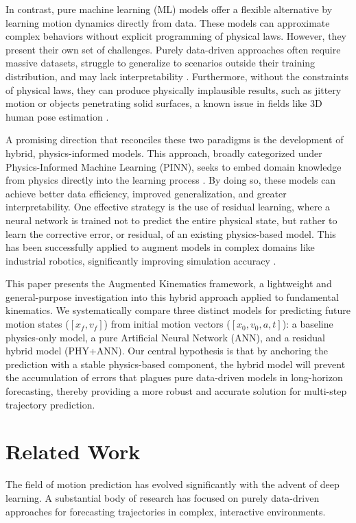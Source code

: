 \documentclass[conference]{IEEEtran}
\begin{document}
In contrast, pure machine learning (ML) models offer a flexible alternative by learning motion dynamics directly from data. These models can approximate complex behaviors without explicit programming of physical laws. However, they present their own set of challenges. Purely data-driven approaches often require massive datasets, struggle to generalize to scenarios outside their training distribution, and may lack interpretability \cite{b5}. Furthermore, without the constraints of physical laws, they can produce physically implausible results, such as jittery motion or objects penetrating solid surfaces, a known issue in fields like 3D human pose estimation \cite{b6}.

A promising direction that reconciles these two paradigms is the development of hybrid, physics-informed models. This approach, broadly categorized under Physics-Informed Machine Learning (PINN), seeks to embed domain knowledge from physics directly into the learning process \cite{b7}. By doing so, these models can achieve better data efficiency, improved generalization, and greater interpretability. One effective strategy is the use of residual learning, where a neural network is trained not to predict the entire physical state, but rather to learn the corrective error, or residual, of an existing physics-based model. This has been successfully applied to augment models in complex domains like industrial robotics, significantly improving simulation accuracy \cite{b8}.

This paper presents the Augmented Kinematics framework, a lightweight and general-purpose investigation into this hybrid approach applied to fundamental kinematics. We systematically compare three distinct models for predicting future motion states ($[x_f, v_f]$) from initial motion vectors ($[x_0, v_0, a, t]$): a baseline physics-only model, a pure Artificial Neural Network (ANN), and a residual hybrid model (PHY+ANN). Our central hypothesis is that by anchoring the prediction with a stable physics-based component, the hybrid model will prevent the accumulation of errors that plagues pure data-driven models in long-horizon forecasting, thereby providing a more robust and accurate solution for multi-step trajectory prediction.

\section{Related Work}
The field of motion prediction has evolved significantly with the advent of deep learning. A substantial body of research has focused on purely data-driven approaches for forecasting trajectories in complex, interactive environments.
\end{document}
